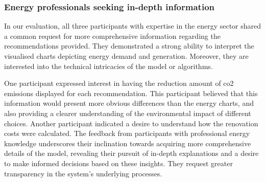 \subsubsection{Energy professionals seeking in-depth information}

In our evaluation, all three participants with expertise in the energy sector shared a common request for more comprehensive information regarding the recommendations provided. 
They demonstrated a strong ability to interpret the visualised charts depicting energy demand and generation.
Moreover, they are interested into the technical intricacies of the model or algorithms. 

One participant expressed interest in having the reduction amount of \gls{co2} emissions displayed for each recommendation. 
This participant believed that this information would present more obvious differences than the energy charts, 
and also providing a clearer understanding of the environmental impact of different choices.
Another participant indicated a desire to understand how the renovation costs were calculated. 
The feedback from participants with professional energy knowledge underscores their inclination towards acquiring more comprehensive details of the model, 
revealing their pursuit of in-depth explanations and a desire to make informed decisions based on these insights. 
They request greater transparency in the system's underlying processes.
